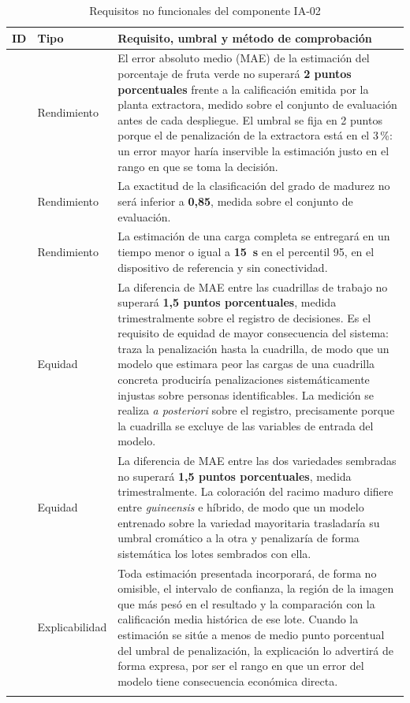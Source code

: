 \begin{longtable}{|C{2.1cm}|C{2.0cm}|L{11.2cm}|}
\hline
{}\textbf{ID} & \textbf{Tipo} & \textbf{Requisito, umbral y método de comprobación}\\ \hline
\endhead
{} & Rendimiento & El error absoluto medio (MAE) de la estimación del porcentaje de fruta verde no superará \textbf{2 puntos porcentuales} frente a la calificación emitida por la planta extractora, medido sobre el conjunto de evaluación antes de cada despliegue. El umbral se fija en 2 puntos porque el de penalización de la extractora está en el 3\,\%: un error mayor haría inservible la estimación justo en el rango en que se toma la decisión. \\ \hline
{} & Rendimiento & La exactitud de la clasificación del grado de madurez no será inferior a \textbf{0,85}, medida sobre el conjunto de evaluación. \\ \hline
{} & Rendimiento & La estimación de una carga completa se entregará en un tiempo menor o igual a \textbf{15~s} en el percentil 95, en el dispositivo de referencia y sin conectividad. \\ \hline
{} & Equidad & La diferencia de MAE entre las cuadrillas de trabajo no superará \textbf{1,5 puntos porcentuales}, medida trimestralmente sobre el registro de decisiones. Es el requisito de equidad de mayor consecuencia del sistema:  traza la penalización hasta la cuadrilla, de modo que un modelo que estimara peor las cargas de una cuadrilla concreta produciría penalizaciones sistemáticamente injustas sobre personas identificables. La medición se realiza \emph{a posteriori} sobre el registro, precisamente porque la cuadrilla se excluye de las variables de entrada del modelo. \\ \hline
{} & Equidad & La diferencia de MAE entre las dos variedades sembradas no superará \textbf{1,5 puntos porcentuales}, medida trimestralmente. La coloración del racimo maduro difiere entre \emph{guineensis} e híbrido, de modo que un modelo entrenado sobre la variedad mayoritaria trasladaría su umbral cromático a la otra y penalizaría de forma sistemática los lotes sembrados con ella. \\ \hline
{} & Explicabilidad & Toda estimación presentada incorporará, de forma no omisible, el intervalo de confianza, la región de la imagen que más pesó en el resultado y la comparación con la calificación media histórica de ese lote. Cuando la estimación se sitúe a menos de medio punto porcentual del umbral de penalización, la explicación lo advertirá de forma expresa, por ser el rango en que un error del modelo tiene consecuencia económica directa. \\ \hline
\caption{Requisitos no funcionales del componente IA-02}
\end{longtable}

